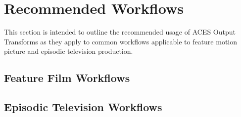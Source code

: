 \numberedformat

\chapter{Recommended Workflows} \label{ch:rec-workflows}
This section is intended to outline the recommended usage of ACES Output Transforms as they apply to common workflows applicable to feature motion picture and episodic television production.

\section{Feature Film Workflows} \label{sec:ff-workflows}
	
	
	
	
	
	
	
	

\section{Episodic Television Workflows} \label{sec:tv-workflows}
	
	
	
	
	
		
	
	

	

